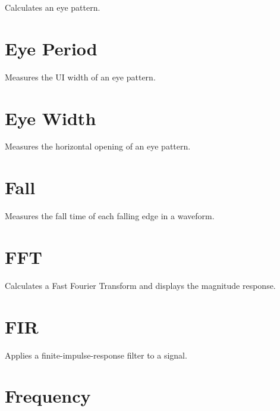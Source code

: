 Calculates an eye pattern.

\pagebreak
\section{Eye Period}

Measures the UI width of an eye pattern.

\pagebreak
\section{Eye Width}

Measures the horizontal opening of an eye pattern.

\pagebreak
\section{Fall}

Measures the fall time of each falling edge in a waveform.

\pagebreak
\section{FFT}

Calculates a Fast Fourier Transform and displays the magnitude response.

\pagebreak
\section{FIR}

Applies a finite-impulse-response filter to a signal.

\pagebreak
\section{Frequency}

